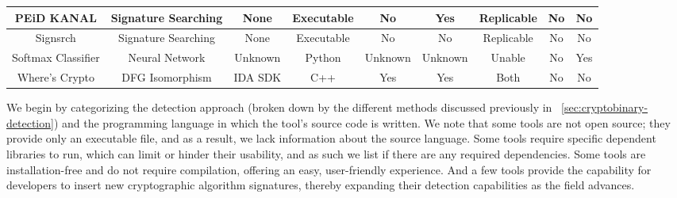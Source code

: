 \begin{table}
\begin{adjustbox}{max width=0.9\textheight}
\begin{tabular}{c||c|c|c|c|c|c|c|c}
PEiD KANAL     & Signature Searching        & None               & Executable & No      & Yes     & Replicable   & No  & No  \\ \hline
Signsrch       & Signature Searching        & None               & Executable & No      & No      & Replicable   & No  & No  \\ \hline
Softmax Classifier & Neural Network         & Unknown            & Python     & Unknown & Unknown & Unable       & No  & Yes \\ \hline
Where's Crypto & DFG Isomorphism            & IDA SDK            & C++        & Yes     & Yes     & Both         & No  & No  \\ \hline
\end{tabular}
\end{adjustbox}
\label{tab:cryptobinary-taxonomy1}
\end{table}

We begin by categorizing the detection approach (broken down by the different methods discussed previously in ~\autoref{sec:cryptobinary-detection}) and the programming language in which the tool's source code is written. We note that some tools are not open source; they provide only an executable file, and as a result, we lack information about the source language.
Some tools require specific dependent libraries to run, which can limit or hinder their usability, and as such we list if there are any required dependencies.
Some tools are installation-free and do not require compilation, offering an easy, user-friendly experience.
And a few tools provide the capability for developers to insert new cryptographic algorithm signatures, thereby expanding their detection capabilities as the field advances.
 
